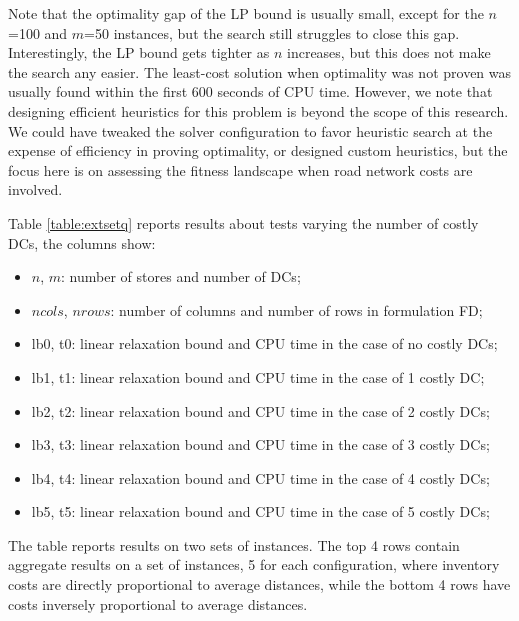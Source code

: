 \documentclass[mnsc,sglanonrev]{informs4}  %
\theoremstyle{remark}\newtheorem{remark}{Remark}
\begin{document}
\begin{APPENDICES}
Note that the optimality gap of the LP bound is usually small, except for the $n$=100 and $m$=50 instances, but the search still struggles to close this gap. Interestingly, the LP bound gets tighter as $n$ increases, but this does not make the search any easier.
The least-cost solution when optimality was not proven was usually found within the first 600 seconds of CPU time. However, we note that designing efficient heuristics for this problem is beyond the scope of this research. We could have tweaked the solver configuration to favor heuristic search at the expense of efficiency in proving optimality, or designed custom heuristics, but the focus here is on assessing the fitness landscape when road network costs are involved.

Table \ref{table:extsetq} reports results about tests varying the number of costly DCs, the columns show:
\begin{itemize}
	\item $n$, $m$: number of stores and number of DCs;
	\item $ncols$, $nrows$: number of columns and number of rows in formulation FD;
	\item lb0, t0: linear relaxation bound and CPU time in the case of no costly DCs;
	\item lb1, t1: linear relaxation bound and CPU time in the case of 1 costly DC;
	\item lb2, t2: linear relaxation bound and CPU time in the case of 2 costly DCs;
	\item lb3, t3: linear relaxation bound and CPU time in the case of 3 costly DCs;
	\item lb4, t4: linear relaxation bound and CPU time in the case of 4 costly DCs;
	\item lb5, t5: linear relaxation bound and CPU time in the case of 5 costly DCs;
\end{itemize}

The table reports results on two sets of instances. The top 4 rows contain aggregate results on a set of instances, 5 for each configuration, where inventory costs are directly proportional to average distances, while the bottom 4 rows have costs inversely proportional to average distances.


\end{APPENDICES}
\end{document}
